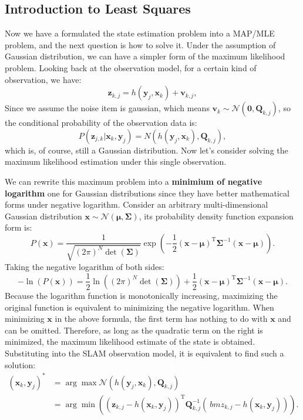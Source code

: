 \subsection{Introduction to Least Squares}
Now we have a formulated the state estimation problem into a MAP/MLE problem, and the next question is how to solve it. Under the assumption of Gaussian distribution, we can have a simpler form of the maximum likelihood problem. Looking back at the observation model, for a certain kind of observation, we have:
\[
{\bm{z}_{k,j}} = h\left( {{ \bm{y}_j},{ \bm{x}_k}} \right)+ \bm{v}_{k, j},
\]
Since we assume the noise item is gaussian, which means ${\bm{v}_k} \sim \mathcal{N}\left( {\bm{0},{{{\bm{Q}}}_{k,j}}} \right)$, so the conditional probability of the observation data is:
\[
P( \bm{z}_{j,k} | \bm{x}_k, \bm{y}_j) = N\left( h(\bm{y}_j, \bm{x}_k), \bm{Q}_{k,j} \right),
\]
which is, of course, still a Gaussian distribution. Now let's consider solving the maximum likelihood estimation under this single observation.

We can rewrite this maximum problem into a \textbf{minimium of negative logarithm} one for Gaussian distributions since they have better mathematical forms under negative logarithm. Consider an arbitrary multi-dimensional Gaussian distribution $\bm{x} \sim \mathcal{N}(\bm{\mu}, \bm{\Sigma})$, its probability density function expansion form is:
\begin{equation}
	P\left( \bm{x} \right) = \frac{1}{{\sqrt {{{(2\pi )}^N}\det (\bm{\Sigma} )} }}\exp \left( {-\frac{1}{2}{{\left( {\bm{x}-\bm{\mu}} \right)}^\mathrm{T}}{ \bm{\Sigma} ^ {-1}}\left( {\bm{x}-\bm{\mu}} \right)} \right).
\end{equation}
Taking the negative logarithm of both sides:
\begin{equation}
	-\ln \left( {P\left( \bm{x} \right)} \right) = \frac{1}{2}\ln \left( {{{\left( {2\pi} \right )}^N}\det \left( \bm{\Sigma} \right)} \right) + \frac{1}{2}{\left( {\bm{x}-\bm{\mu}} \right)^\mathrm{T}}{\bm{\Sigma} ^{-1}}\left( {\bm{x}-\bm{\mu}} \right).
\end{equation}
Because the logarithm function is monotonically increasing, maximizing the original function is equivalent to minimizing the negative logarithm. When minimizing $\bm{x}$ in the above formula, the first term has nothing to do with $\bm{x}$ and can be omitted. Therefore, as long as the quadratic term on the right is minimized, the maximum likelihood estimate of the state is obtained. Substituting into the SLAM observation model, it is equivalent to find such a solution:
\begin{equation}
	\begin{aligned}
		(\bm{x}_k,\bm{y}_j)^* &= \arg \max \mathcal{N}(h(\bm{y}_j, \bm{x}_k), \bm{Q }_{k,j}) \\ &= \arg \min \left( {{{\left( {{ \bm{z}_{k,j}}-h\left( {{\bm{x }_k},{\bm{y}_j}} \right)} \right)}^\mathrm{T}} \bm{Q}_{k,j}^{-1}\left( {{\ bm{z}_{k,j}}-h\left( {{\bm{x}_k},{\bm{y}_j}} \right)} \right)} \right).
	\end{aligned}
\end{equation}

